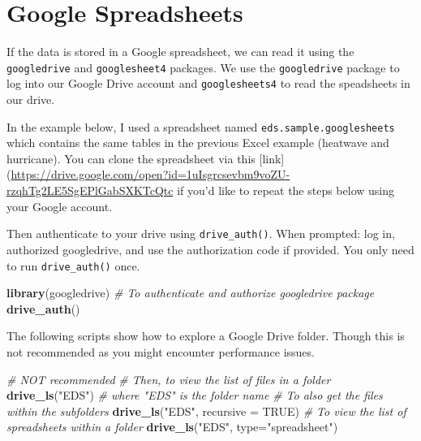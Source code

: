 \documentclass[
]{book}
\newenvironment{Shaded}{\begin{snugshade}}{\end{snugshade}}
\newcommand{\CommentTok}[1]{\textcolor[rgb]{0.56,0.35,0.01}{\textit{#1}}}
\newcommand{\DataTypeTok}[1]{\textcolor[rgb]{0.13,0.29,0.53}{#1}}
\newcommand{\KeywordTok}[1]{\textcolor[rgb]{0.13,0.29,0.53}{\textbf{#1}}}
\newcommand{\NormalTok}[1]{#1}
\newcommand{\OtherTok}[1]{\textcolor[rgb]{0.56,0.35,0.01}{#1}}
\newcommand{\StringTok}[1]{\textcolor[rgb]{0.31,0.60,0.02}{#1}}
\begin{document}
\hypertarget{google-spreadsheets}{%
\section{Google Spreadsheets}\label{google-spreadsheets}}

If the data is stored in a Google spreadsheet, we can read it using the \texttt{googledrive} and \texttt{googlesheet4} packages. We use the \texttt{googledrive} package to log into our Google Drive account and \texttt{googlesheets4} to read the speadsheets in our drive.

In the example below, I used a spreadsheet named \texttt{eds.sample.googlesheets} which contains the same tables in the previous Excel example (heatwave and hurricane). You can clone the spreadsheet via this {[}link{]} (\url{https://drive.google.com/open?id=1uIsgrcsevbm9voZU-rzqhTg2LE5SgEPlGabSXKTcQtc} if you'd like to repeat the steps below using your Google account.

Then authenticate to your drive using \texttt{drive\_auth()}. When prompted: log in, authorized googledrive, and use the authorization code if provided. You only need to run \texttt{drive\_auth()} once.

\begin{Shaded}
\begin{Highlighting}[]
\KeywordTok{library}\NormalTok{(googledrive)}
\CommentTok{\# To authenticate and authorize googledrive package}
\KeywordTok{drive\_auth}\NormalTok{()}
\end{Highlighting}
\end{Shaded}

The following scripts show how to explore a Google Drive folder. Though this is not recommended as you might encounter performance issues.

\begin{Shaded}
\begin{Highlighting}[]
\CommentTok{\# NOT recommended}
\CommentTok{\# Then, to view the list of files in a folder}
\KeywordTok{drive\_ls}\NormalTok{(}\StringTok{"EDS"}\NormalTok{) }\CommentTok{\# where "EDS" is the folder name}
\CommentTok{\# To also get the files within the subfolders}
\KeywordTok{drive\_ls}\NormalTok{(}\StringTok{"EDS"}\NormalTok{, }\DataTypeTok{recursive =} \OtherTok{TRUE}\NormalTok{)}
\CommentTok{\# To view the list of spreadsheets within a folder}
\KeywordTok{drive\_ls}\NormalTok{(}\StringTok{"EDS"}\NormalTok{, }\DataTypeTok{type=}\StringTok{"spreadsheet"}\NormalTok{)}
\end{Highlighting}
\end{Shaded}
\end{document}
